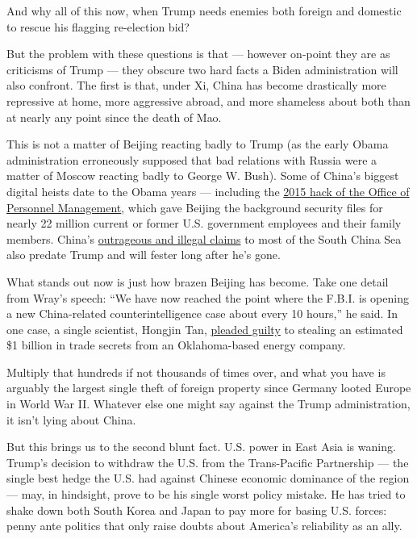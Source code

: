 And why all of this now, when Trump needs enemies both foreign and
domestic to rescue his flagging re-election bid?

But the problem with these questions is that --- however on-point they
are as criticisms of Trump --- they obscure two hard facts a Biden
administration will also confront. The first is that, under Xi, China
has become drastically more repressive at home, more aggressive abroad,
and more shameless about both than at nearly any point since the death
of Mao.

This is not a matter of Beijing reacting badly to Trump (as the early
Obama administration erroneously supposed that bad relations with Russia
were a matter of Moscow reacting badly to George W. Bush). Some of
China's biggest digital heists date to the Obama years --- including the
\href{https://www.lawfareblog.com/why-opm-hack-far-worse-you-imagine}{2015
hack of the Office of Personnel Management}, which gave Beijing the
background security files for nearly 22 million current or former U.S.
government employees and their family members. China's
\href{https://www.nytimes.com/2016/07/13/world/asia/south-china-sea-hague-ruling-philippines.html}{outrageous
and illegal claims} to most of the South China Sea also predate Trump
and will fester long after he's gone.

What stands out now is just how brazen Beijing has become. Take one
detail from Wray's speech: ``We have now reached the point where the
F.B.I. is opening a new China-related counterintelligence case about
every 10 hours,'' he said. In one case, a single scientist, Hongjin Tan,
\href{https://www.wsj.com/articles/chinese-national-sentenced-to-prison-in-1-billion-trade-secret-theft-case-11582839551}{pleaded
guilty} to stealing an estimated \$1 billion in trade secrets from an
Oklahoma-based energy company.

Multiply that hundreds if not thousands of times over, and what you have
is arguably the largest single theft of foreign property since Germany
looted Europe in World War II. Whatever else one might say against the
Trump administration, it isn't lying about China.

But this brings us to the second blunt fact. U.S. power in East Asia is
waning. Trump's decision to withdraw the U.S. from the Trans-Pacific
Partnership --- the single best hedge the U.S. had against Chinese
economic dominance of the region --- may, in hindsight, prove to be his
single worst policy mistake. He has tried to shake down both South Korea
and Japan to pay more for basing U.S. forces: penny ante politics that
only raise doubts about America's reliability as an ally.

